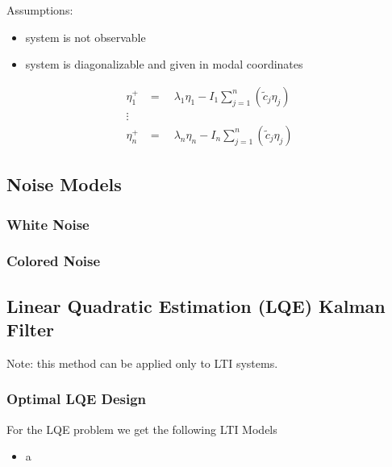Assumptions:
\begin{itemize}
    \item system is not observable
    \item system is diagonalizable and given in modal coordinates
\end{itemize}
\begin{align*}
    \eta_1^+ & =\quad\lambda_1\eta_1-I_1\sum_{j=1}^n\left(\tilde{c}_j\eta_j\right) \\
    \vdots                                                                         \\
    \eta_n^+ & =\quad\lambda_n\eta_n-I_n\sum_{j=1}^n\left(\tilde{c}_j\eta_j\right)
\end{align*}



\subsection{Noise Models}
\subsubsection{White Noise}

\subsubsection{Colored Noise}



\subsection{Linear Quadratic Estimation (LQE) Kalman Filter}
Note: this method can be applied only to LTI systems.

\subsubsection{Optimal LQE Design}
For the LQE problem we get the following LTI Models

%
\begin{itemize}
    \item a
\end{itemize}